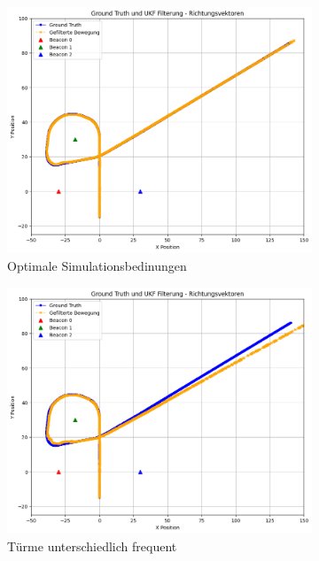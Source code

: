 \begin{figure}
    \begin{subfigure}{.333\textwidth}
        \centering
        \includegraphics[width=.9\linewidth]{Ergebnisse/plots_fahrten/richtung/richtung_const_vel_basic.png}  
        \caption{Optimale Simulationsbedinungen}
    \end{subfigure}    
    \begin{subfigure}{.333\textwidth}
        \centering
        \includegraphics[width=.9\linewidth]{Ergebnisse/plots_fahrten/richtung/richtung_const_vel_freq.png} 
        \caption{Türme unterschiedlich frequent}
    \end{subfigure}    
    \begin{subfigure}{.333\textwidth}

\end{subfigure}
\end{figure}
